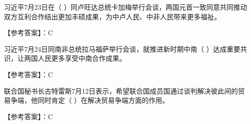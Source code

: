 \question 习近平7月23日在（
）同卢旺达总统卡加梅举行会谈，两国元首一致同意共同推动双方互利合作结出更加丰硕成果，为中卢人民、中非人民带来更多福祉。
\par{}
\begin{solution}【参考答案】：C
\end{solution}
\question 习近平7月24日同南非总统拉马福萨举行会谈，就推进新时期中南（
）达成重要共识，让两国人民更多享受中南合作成果。
\par{}
\begin{solution}【参考答案】：C
\end{solution}
\question 联合国秘书长古特雷斯7月12日表示，希望联合国成员国通过谈判解决彼此间的贸易争端，他同时肯定（
）在解决贸易争端方面的作用。
\par{}
\begin{solution}【参考答案】：C
\end{solution}
